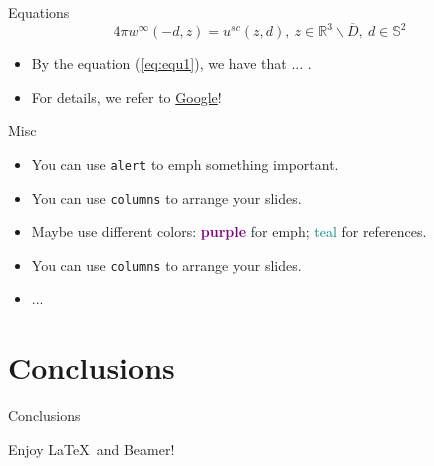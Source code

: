 \documentclass[aspectratio=169]{beamer}
\begin{document}
\begin{frame}{Equations}
	\begin{equation} \label{eq:equ1}
		4\pi w^{\infty}\left(-d, z\right) = u^{sc}\left(z, d\right),\ z \in \mathbb{R}^{3}\backslash \overline{D},\ d \in \mathbb{S}^{2}
	\end{equation}	
	
	\begin{itemize}
	    \item By the equation (\ref{eq:equ1}), we have that ... .
	    \item For details, we refer to \href{www.google.com}{Google}!
	\end{itemize}
\end{frame}


\begin{frame}{Misc}
	\begin{itemize}
		\item<1-> You can use \texttt{alert}  to emph \alert{something important}.
		\item<2-> You can use \texttt{columns} to arrange your slides.
		\item<3-> Maybe use different colors: \textbf{\textcolor{purple}{purple}} for 
		          emph; \textcolor{teal}{teal} for references.
		\item<4-> You can use \texttt{columns} to arrange your slides.
		\item<5-> ...
	\end{itemize}
	
\end{frame}


\section{Conclusions}


\begin{frame}{Conclusions}
	\begin{center}
		Enjoy \LaTeX\ and Beamer!
	\end{center}
\end{frame}
\end{document}

